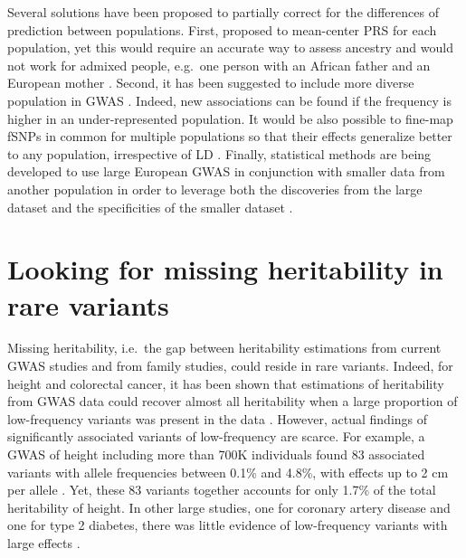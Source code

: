 Several solutions have been proposed to partially correct for the differences of prediction between populations. First, \cite{martin2017human} proposed to mean-center PRS for each population, yet this would require an accurate way to assess ancestry and would not work for admixed people, e.g.\ one person with an African father and an European mother \cite[]{reisberg2017comparing}.
Second, it has been suggested to include more diverse population in GWAS \cite[]{pulit2010multiethnic}. Indeed, new associations can be found if the frequency is higher in an under-represented population. 
It would be also possible to fine-map fSNPs in common for multiple populations so that their effects generalize better to any population, irrespective of LD \cite[]{carlson2013generalization,finemap,wojcik2018page}.
Finally, statistical methods are being developed to use large European GWAS in conjunction with smaller data from another population in order to leverage both the discoveries from the large dataset and the specificities of the smaller dataset \cite[]{marquez2017multiethnic,coram2017leveraging}.


\section{Looking for missing heritability in rare variants}

Missing heritability, i.e.\ the gap between heritability estimations from current GWAS studies and from family studies, could reside in rare variants.
Indeed, for height and colorectal cancer, it has been shown that estimations of heritability from GWAS data could recover almost all heritability when a large proportion of low-frequency variants was present in the data \cite[]{yang2015genetic,huyghe2019discovery,wainschtein2019recovery}.
However, actual findings of significantly associated variants of low-frequency are scarce. 
For example, a GWAS of height including more than 700K individuals found 83 associated variants with allele frequencies between 0.1\% and 4.8\%, with effects up to 2 cm per allele \cite[]{marouli2017rare}. Yet, these 83 variants together accounts for only 1.7\% of the total heritability of height. 
In other large studies, one for coronary artery disease and one for type 2 diabetes, there was little evidence of low-frequency variants with large effects \cite[]{nikpay2015comprehensive,fuchsberger2016genetic}.

